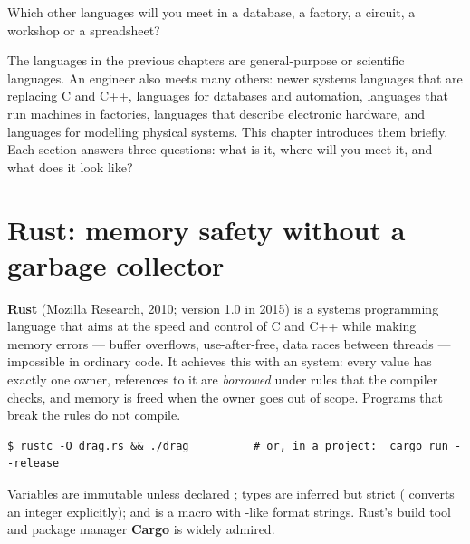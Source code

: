 {}
\label{ch:others}

\begin{researchquestion}
Which other languages will you meet in a database, a factory, a circuit, a workshop or a spreadsheet?
\end{researchquestion}
\OrientationNote

The languages in the previous chapters are general-purpose or scientific languages. An
engineer also meets many others: newer systems languages that are replacing C and C++,
languages for databases and automation, languages that run machines in factories,
languages that describe electronic hardware, and languages for modelling physical
systems. This chapter introduces them briefly. Each section answers three questions: what
is it, where will you meet it, and what does it look like?


\section{Rust: memory safety without a garbage collector}
\label{sec:rust}

\textbf{Rust} (Mozilla Research, 2010; version 1.0 in 2015) is a systems programming
language that aims at the speed and control of C and C++ while making memory errors ---
buffer overflows, use-after-free, data races between threads --- impossible in ordinary
code. It achieves this with an  system: every value has exactly one owner,
references to it are \emph{borrowed} under rules that the compiler checks, and memory is
freed when the owner goes out of scope. Programs that break the rules do not compile.
\begin{lstlisting}[style=shell]
$ rustc -O drag.rs && ./drag          # or, in a project:  cargo run --release
\end{lstlisting}
Variables are immutable unless declared ; types are inferred but strict
( converts an integer explicitly); and  is a macro with
\py-like format strings. Rust's build tool and package manager \textbf{Cargo} is
widely admired.

